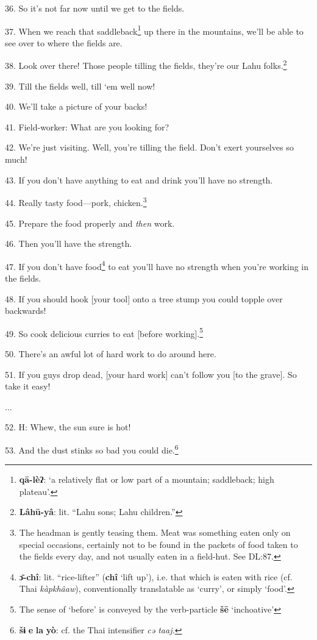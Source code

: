 36. So it's not far now until we get to the fields.

37. When we reach that saddleback\footnote{\textbf{qā-lèʔ}: `a relatively flat or low part of a mountain; saddleback; high plateau'.} up there in the mountains, we'll be able
to see over to where the fields are.

38. Look over there! Those people tilling the fields, they're our Lahu folks.\footnote{\textbf{Lâhū-yâ}: lit. ``Lahu sons; Lahu children.''}

39.  Till the fields well, till `em
well now!

40. We'll take a picture of your backs!

41. Field-worker: What are you looking for?

42. We're just visiting. Well, you're tilling the field. Don't exert yourselves
so much!

43. If you don't have anything to eat and drink you'll have no strength.

44. Really tasty food---pork, chicken.\footnote{The headman is gently teasing them. Meat was something eaten only on special occasions, certainly not to be found in the packets of food taken to the fields every day, and not usually eaten in a field-hut. See DL:87.}

45. Prepare the food properly and \textit{then} work.

46. Then you'll have the strength.

47. If you don't have food\footnote{\textbf{ɔ̄-chî}: lit. ``rice-lifter'' (\textbf{chî} `lift up'), i.e. that which is eaten with rice (cf. Thai \textit{kàpkhâaw}), conventionally translatable as `curry', or simply `food'.} to eat you'll have no strength when you're working
in the fields.

48. If you should hook [your tool] onto a tree stump you could topple over backwards!

49. So cook delicious curries to eat [before working].\footnote{The sense of `before' is conveyed by the verb-particle \textbf{šē} `inchoative'}

50. There's an awful lot of hard work to do around here.

51. If you guys drop dead, [your hard work] can't follow you [to the grave]. So
take it easy!

...

52. H: Whew, the sun sure is hot!

53. And the dust stinks so bad you could die.\footnote{\textbf{šɨ} \textbf{e} \textbf{la} \textbf{yò}: cf. the Thai intensifier \textit{cə taaj.}}

